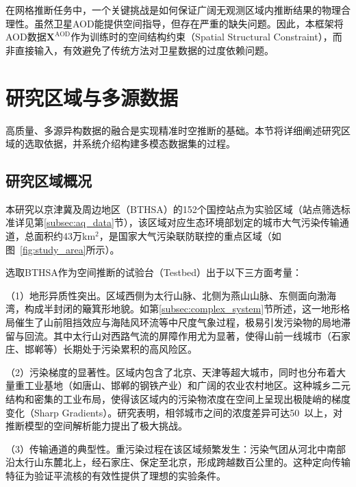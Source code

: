 在网格推断任务中，一个关键挑战是如何保证广阔无观测区域内推断结果的物理合理性。虽然卫星AOD能提供空间指导，但存在严重的缺失问题。因此，本框架将AOD数据$\mathbf{X}^{\text{AOD}}$作为训练时的空间结构约束（Spatial Structural Constraint），而非直接输入，有效避免了传统方法对卫星数据的过度依赖问题。


\section{研究区域与多源数据}
\label{sec:infer_data}

高质量、多源异构数据的融合是实现精准时空推断的基础。本节将详细阐述研究区域的选取依据，并系统介绍构建多模态数据集的过程。

\subsection{研究区域概况}
\label{subsec:study_area}

本研究以京津冀及周边地区（BTHSA）的152个国控站点为实验区域（站点筛选标准详见第\ref{subsec:aq_data}节），该区域对应生态环境部划定的城市大气污染传输通道\citep{lu2021estimation}，总面积约43万km$^2$，是国家大气污染联防联控的重点区域（如图~\ref{fig:study_area}所示）。

选取BTHSA作为空间推断的试验台（Testbed）出于以下三方面考量：

（1）地形异质性突出。区域西侧为太行山脉、北侧为燕山山脉、东侧面向渤海湾，构成半封闭的簸箕形地貌。如第\ref{subsec:complex_system}节所述，这一地形格局催生了山前阻挡效应与海陆风环流等中尺度气象过程，极易引发污染物的局地滞留与回流\citep{zhong2018feedback}。其中太行山对西路气流的屏障作用尤为显著，使得山前一线城市（石家庄、邯郸等）长期处于污染累积的高风险区\citep{quan2020regional}。

（2）污染梯度的显著性。区域内包含了北京、天津等超大城市，同时也分布着大量重工业基地（如唐山、邯郸的钢铁产业）和广阔的农业农村地区。这种城乡二元结构和密集的工业布局，使得该区域内的污染物浓度在空间上呈现出极陡峭的梯度变化（Sharp Gradients）\citep{chen2020influence}。研究表明，相邻城市之间的\PM 浓度差异可达50~\ug{}以上，对推断模型的空间解析能力提出了极大挑战。

（3）传输通道的典型性。重污染过程在该区域频繁发生：污染气团从河北中南部沿太行山东麓北上，经石家庄、保定至北京，形成跨越数百公里的\citep{yin2025regional}。这种定向传输特征为验证平流核的有效性提供了理想的实验条件。

